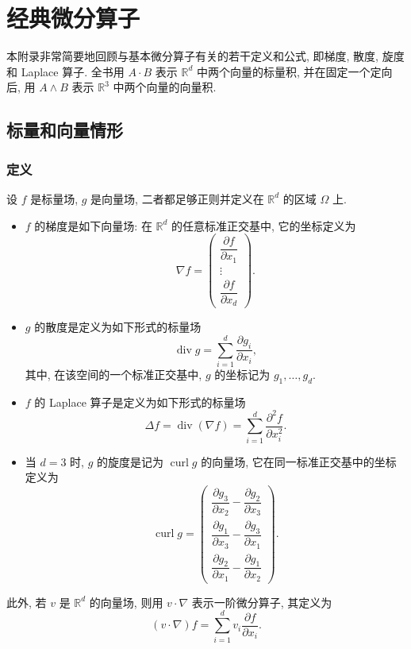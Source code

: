 \clearpage
\appendix
\section{经典微分算子}
\label{chap:appendix-classic-differential-operators}
\label{app:vector-operator-identities}
\renewcommand{\thestatement}{A.1.\arabic{statement}}
\renewcommand{\theHstatement}{appA.sec01.\arabic{statement}}
\setcounter{statement}{0}
\renewcommand{\theequation}{A.\arabic{equation}}
\renewcommand{\theHequation}{appA.\arabic{equation}}
\setcounter{equation}{0}

本附录非常简要地回顾与基本微分算子有关的若干定义和公式, 即梯度, 散度, 旋度和 Laplace 算子. 全书用 $A\cdot B$ 表示 $\mathbb R^d$ 中两个向量的标量积, 并在固定一个定向后, 用 $A\wedge B$ 表示 $\mathbb R^3$ 中两个向量的向量积.

\subsection{标量和向量情形}
\label{sec:app-a-scalar-vector-cases}

\subsubsection{定义}
\label{subsec:app-a-definitions}

\begin{Definition}
\label{def:app-a-basic-vector-operators}
设 $f$ 是标量场, $g$ 是向量场, 二者都足够正则并定义在 $\mathbb R^d$ 的区域 $\Omega$ 上.
\begin{itemize}
 \item $f$ 的梯度是如下向量场: 在 $\mathbb R^d$ 的任意标准正交基中, 它的坐标定义为
 \[
  \nabla f=
  \begin{pmatrix}
   \dfrac{\partial f}{\partial x_1}\\[3pt]
   \vdots\\[3pt]
   \dfrac{\partial f}{\partial x_d}
  \end{pmatrix}.
 \]
 \item $g$ 的散度是定义为如下形式的标量场
 \[
  \operatorname{div}g=\sum_{i=1}^d\frac{\partial g_i}{\partial x_i},
 \]
 其中, 在该空间的一个标准正交基中, $g$ 的坐标记为 $g_1,\ldots,g_d$.
 \item $f$ 的 Laplace 算子是定义为如下形式的标量场
 \[
  \Delta f=\operatorname{div}(\nabla f)
  =\sum_{i=1}^d\frac{\partial^2f}{\partial x_i^2}.
 \]
 \item 当 $d=3$ 时, $g$ 的旋度是记为 $\operatorname{curl}g$ 的向量场, 它在同一标准正交基中的坐标定义为
 \[
  \operatorname{curl}g=
  \begin{pmatrix}
   \dfrac{\partial g_3}{\partial x_2}-\dfrac{\partial g_2}{\partial x_3}\\[5pt]
   \dfrac{\partial g_1}{\partial x_3}-\dfrac{\partial g_3}{\partial x_1}\\[5pt]
   \dfrac{\partial g_2}{\partial x_1}-\dfrac{\partial g_1}{\partial x_2}
  \end{pmatrix}.
 \]
\end{itemize}
此外, 若 $v$ 是 $\mathbb R^d$ 的向量场, 则用 $v\cdot\nabla$ 表示一阶微分算子, 其定义为
\[
 (v\cdot\nabla)f=\sum_{i=1}^d v_i\frac{\partial f}{\partial x_i}.
\]
\end{Definition}

